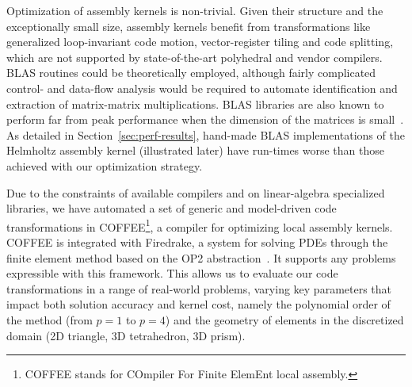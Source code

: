 \documentclass[conference]{IEEEtran}
\begin{document}
Optimization of assembly kernels is non-trivial. Given their structure and the exceptionally small size, assembly kernels benefit from transformations like generalized loop-invariant code motion, vector-register tiling and code splitting, which are not supported by state-of-the-art polyhedral and vendor compilers. BLAS routines could be theoretically employed, although fairly complicated control- and data-flow analysis would be required to automate identification and extraction of matrix-matrix multiplications. BLAS libraries are also known to perform far from peak performance when the dimension of the matrices is small~\cite{nek5000}. As detailed in Section~\ref{sec:perf-results}, hand-made BLAS implementations of the Helmholtz assembly kernel (illustrated later) have run-times worse than those achieved with our optimization strategy. 



Due to the constraints of available compilers and on linear-algebra specialized libraries, we have automated a set of generic and model-driven code transformations in COFFEE\footnote{COFFEE stands for COmpiler For Finite ElemEnt local assembly.}, a compiler for optimizing local assembly kernels. COFFEE is integrated with Firedrake, a system for solving PDEs through the finite element method based on the OP2 abstraction~\cite{firedrake-code}. It supports any problems expressible with this framework. This allows us to evaluate our code transformations in a range of real-world problems, varying key parameters that impact both solution accuracy and kernel cost, namely the polynomial order of the method (from $p=1$ to $p=4$) and the geometry of elements in the discretized domain (2D triangle, 3D tetrahedron, 3D prism). 
\end{document}
